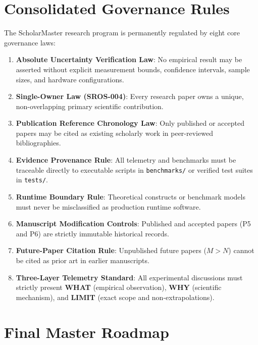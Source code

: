 \documentclass[11pt,letterpaper]{article}
\begin{document}
\section{Consolidated Governance Rules}

The ScholarMaster research program is permanently regulated by eight core governance laws:
\begin{enumerate}[leftmargin=*]
    \item \textbf{Absolute Uncertainty Verification Law}: No empirical result may be asserted without explicit measurement bounds, confidence intervals, sample sizes, and hardware configurations.
    \item \textbf{Single-Owner Law (SROS-004)}: Every research paper owns a unique, non-overlapping primary scientific contribution.
    \item \textbf{Publication Reference Chronology Law}: Only published or accepted papers may be cited as existing scholarly work in peer-reviewed bibliographies.
    \item \textbf{Evidence Provenance Rule}: All telemetry and benchmarks must be traceable directly to executable scripts in \texttt{benchmarks/} or verified test suites in \texttt{tests/}.
    \item \textbf{Runtime Boundary Rule}: Theoretical constructs or benchmark models must never be misclassified as production runtime software.
    \item \textbf{Manuscript Modification Controls}: Published and accepted papers (P5 and P6) are strictly immutable historical records.
    \item \textbf{Future-Paper Citation Rule}: Unpublished future papers ($M > N$) cannot be cited as prior art in earlier manuscripts.
    \item \textbf{Three-Layer Telemetry Standard}: All experimental discussions must strictly present \textbf{WHAT} (empirical observation), \textbf{WHY} (scientific mechanism), and \textbf{LIMIT} (exact scope and non-extrapolations).
\end{enumerate}

\section{Final Master Roadmap}
\end{document}
